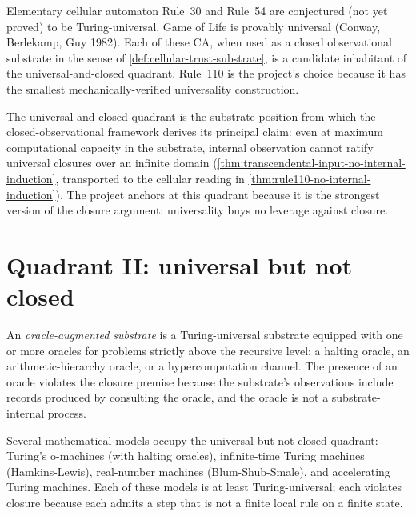 \begin{example}
\label{ex:quadrant-other-ca-at-uc}
Elementary cellular automaton Rule~30 and Rule~54 are conjectured (not yet proved) to be Turing-universal. Game of Life is provably universal (Conway, Berlekamp, Guy 1982). Each of these CA, when used as a closed observational substrate in the sense of \autoref{def:cellular-trust-substrate}, is a candidate inhabitant of the universal-and-closed quadrant. Rule~110 is the project's choice because it has the smallest mechanically-verified universality construction.
\end{example}

\begin{principle}
\label{prin:quadrant-uc-is-anchor}
The universal-and-closed quadrant is the substrate position from which the closed-observational framework derives its principal claim: even at maximum computational capacity in the substrate, internal observation cannot ratify universal closures over an infinite domain (\autoref{thm:transcendental-input-no-internal-induction}, transported to the cellular reading in \autoref{thm:rule110-no-internal-induction}). The project anchors at this quadrant because it is the strongest version of the closure argument: universality buys no leverage against closure.
\end{principle}

\section{Quadrant II: universal but not closed}
\label{sec:quadrant-universal-open}

\begin{definition}
\label{def:quadrant-oracle-substrate}
An \emph{oracle-augmented substrate} is a Turing-universal substrate equipped with one or more oracles for problems strictly above the recursive level: a halting oracle, an arithmetic-hierarchy oracle, or a hypercomputation channel. The presence of an oracle violates the closure premise because the substrate's observations include records produced by consulting the oracle, and the oracle is not a substrate-internal process.
\end{definition}

\begin{example}
\label{ex:quadrant-hypercomputation-models}
Several mathematical models occupy the universal-but-not-closed quadrant: Turing's o-machines (with halting oracles), infinite-time Turing machines (Hamkins-Lewis), real-number machines (Blum-Shub-Smale), and accelerating Turing machines. Each of these models is at least Turing-universal; each violates closure because each admits a step that is not a finite local rule on a finite state.
\end{example}

